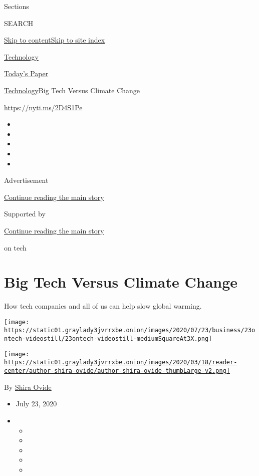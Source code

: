 Sections

SEARCH

\protect\hyperlink{site-content}{Skip to
content}\protect\hyperlink{site-index}{Skip to site index}

\href{https://www.nytimes3xbfgragh.onion/section/technology}{Technology}

\href{https://myaccount.nytimes3xbfgragh.onion/auth/login?response_type=cookie\&client_id=vi}{}

\href{https://www.nytimes3xbfgragh.onion/section/todayspaper}{Today's
Paper}

\href{/section/technology}{Technology}\textbar{}Big Tech Versus Climate
Change

\href{https://nyti.ms/2D4S1Pe}{https://nyti.ms/2D4S1Pe}

\begin{itemize}
\item
\item
\item
\item
\item
\end{itemize}

Advertisement

\protect\hyperlink{after-top}{Continue reading the main story}

Supported by

\protect\hyperlink{after-sponsor}{Continue reading the main story}

on tech

\hypertarget{big-tech-versus-climate-change}{%
\section{Big Tech Versus Climate
Change}\label{big-tech-versus-climate-change}}

How tech companies and all of us can help slow global warming.

\texttt{[image: https://static01.graylady3jvrrxbe.onion/images/2020/07/23/business/23ontech-videostill/23ontech-videostill-mediumSquareAt3X.png]}

\href{https://www.nytimes3xbfgragh.onion/by/shira-ovide}{\texttt{[image: https://static01.graylady3jvrrxbe.onion/images/2020/03/18/reader-center/author-shira-ovide/author-shira-ovide-thumbLarge-v2.png]}}

By \href{https://www.nytimes3xbfgragh.onion/by/shira-ovide}{Shira Ovide}

\begin{itemize}
\item
  July 23, 2020
\item
  \begin{itemize}
  \item
  \item
  \item
  \item
  \item
  \end{itemize}
\end{itemize}


